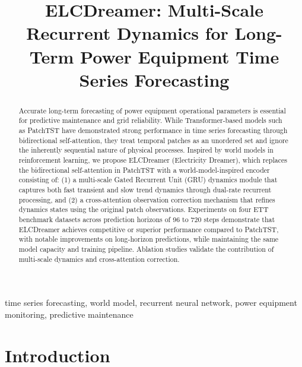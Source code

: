 \documentclass[conference]{IEEEtran}
\begin{document}
\title{ELCDreamer: Multi-Scale Recurrent Dynamics for Long-Term Power Equipment Time Series Forecasting}

\author{
}

\maketitle

\begin{abstract}
Accurate long-term forecasting of power equipment operational parameters is essential for predictive maintenance and grid reliability. While Transformer-based models such as PatchTST have demonstrated strong performance in time series forecasting through bidirectional self-attention, they treat temporal patches as an unordered set and ignore the inherently sequential nature of physical processes. Inspired by world models in reinforcement learning, we propose ELCDreamer (Electricity Dreamer), which replaces the bidirectional self-attention in PatchTST with a world-model-inspired encoder consisting of: (1) a multi-scale Gated Recurrent Unit (GRU) dynamics module that captures both fast transient and slow trend dynamics through dual-rate recurrent processing, and (2) a cross-attention observation correction mechanism that refines dynamics states using the original patch observations. Experiments on four ETT benchmark datasets across prediction horizons of 96 to 720 steps demonstrate that ELCDreamer achieves competitive or superior performance compared to PatchTST, with notable improvements on long-horizon predictions, while maintaining the same model capacity and training pipeline. Ablation studies validate the contribution of multi-scale dynamics and cross-attention correction.
\end{abstract}

\begin{IEEEkeywords}
time series forecasting, world model, recurrent neural network, power equipment monitoring, predictive maintenance
\end{IEEEkeywords}

\section{Introduction}
\end{document}
